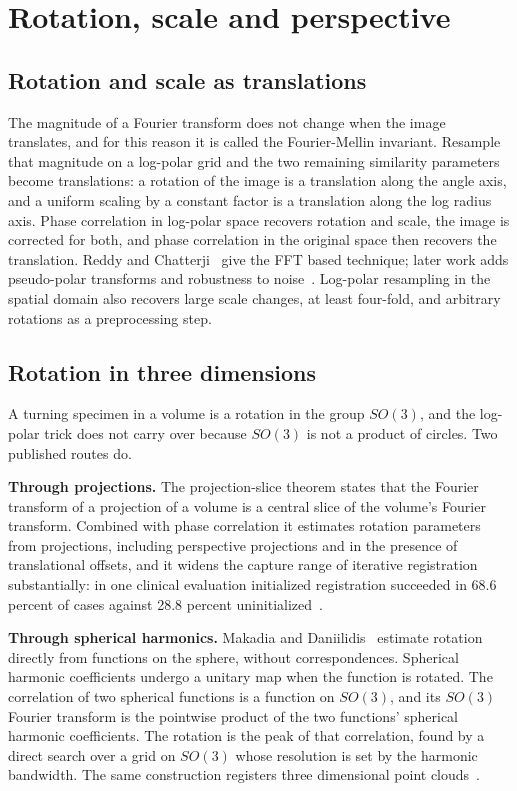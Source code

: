 \chapter{Rotation, scale and perspective}

\section{Rotation and scale as translations}

The magnitude of a Fourier transform does not change when the image translates, and for this reason it
is called the Fourier-Mellin invariant. Resample that magnitude on a log-polar grid and the two
remaining similarity parameters become translations: a rotation of the image is a translation
along the angle axis, and a uniform scaling by a constant factor is a translation along the log
radius axis. Phase correlation in log-polar space recovers rotation and scale, the image is corrected
for both, and phase correlation in the original space then recovers the translation. Reddy and
Chatterji~\cite{src:Reddy-and-Chatterji} give the FFT based technique; later work adds pseudo-polar transforms and robustness
to noise~\cite{src:doi-10-1109-tip-2005-854501}. Log-polar resampling in the spatial domain also recovers large scale changes, at least
four-fold, and arbitrary rotations as a preprocessing step.

\section{Rotation in three dimensions}

A turning specimen in a volume is a rotation in the group \(SO(3)\), and the log-polar trick does not
carry over because \(SO(3)\) is not a product of circles. Two published routes do.

\textbf{Through projections.} The projection-slice theorem states that the Fourier transform of a
projection of a volume is a central slice of the volume's Fourier transform. Combined with phase
correlation it estimates rotation parameters from projections, including perspective projections
and in the presence of translational offsets, and it widens the capture range of iterative
registration substantially: in one clinical evaluation initialized registration succeeded in 68.6
percent of cases against 28.8 percent uninitialized~\cite{src:van-der-Bom-et-al-2010}.

\textbf{Through spherical harmonics.} Makadia and Daniilidis~\cite{src:Makadia-and-Daniilidis-2006} estimate rotation directly from
functions on the sphere, without correspondences. Spherical harmonic coefficients undergo a unitary
map when the function is rotated. The correlation of two spherical functions is a function on
\(SO(3)\), and its \(SO(3)\) Fourier transform is the pointwise product of the two functions' spherical
harmonic coefficients. The rotation is the peak of that correlation, found by a direct search over a
grid on \(SO(3)\) whose resolution is set by the harmonic bandwidth. The same construction registers
three dimensional point clouds~\cite{src:Makadia-Patterson-and-Daniilidis}.

